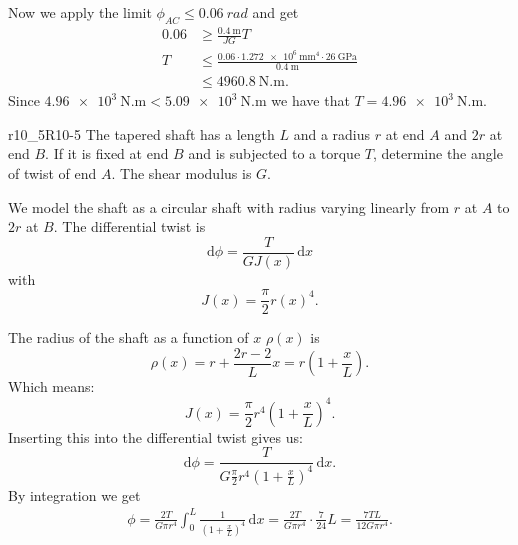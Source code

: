 \begin{derivation}
  Now we apply the limit $\phi_{AC} \leq \qty{0,06}{rad}$ and get
  \begin{align*}
    \num{0,06} &\geq \frac{\qty{0,4}{\m}}{JG} T \\
    T &\leq \frac{\num{0.06} \cdot \qty{1,272e6}{\mm^{4}} \cdot \qty{26}{\GPa}}{\qty{0,4}{\m} } \\
      &\leq \qty{4960,8}{\N.\m} 
  .\end{align*}
  Since $\qty{4,96e3}{\N.\m} < \qty{5,09e3}{\N.\m}$ we have that $T = \qty{4,96e3}{\N.\m}$.
\end{derivation}


\begin{problemwithimage}{r10_5}{R10-5}
  The tapered shaft has a length $L$ and a radius $r$ at end $A$ and $2r$ at end $B$.
  If it is fixed at end $B$ and is subjected to a torque $T$, determine the angle of twist of end $A$.
  The shear modulus is $G$.
\end{problemwithimage}

\begin{derivation}
  We model the shaft as a circular shaft with radius varying linearly from $r$ at $A$ to $2r$ at $B$.
  The differential twist is
  \begin{equation*}
    \mathrm{d}\phi = \frac{T}{GJ(x)} \, \mathrm{d}x 
  \end{equation*}
  with
  \begin{equation*}
    J(x) = \frac{\pi}{2} r(x)^{4}
  .\end{equation*}
  
  The radius of the shaft as a function of $x$ $\rho(x)$ is
  \begin{equation*}
    \rho(x) = r + \frac{2r - 2}{L}x = r \left( 1 + \frac{x}{L} \right)
  .\end{equation*}
  Which means:
  \begin{equation*}
    J(x) = \frac{\pi}{2} r^{4} \left( 1 + \frac{x}{L} \right)^{4}
  .\end{equation*}
  Inserting this into the differential twist gives us:
  \begin{equation*}
    \mathrm{d}\phi = \frac{T}{G \frac{\pi}{2} r^{4} \left( 1 + \frac{x}{L} \right)^{4}} \, \mathrm{d}x 
  .\end{equation*}
  By integration we get
  \begin{align*}
    \phi = \frac{2T}{G \pi r^{4}} \int_{0}^{L} \frac{1}{\left( 1 + \frac{x}{L} \right)^{4}}\, \mathrm{d}x  = \frac{2T}{G \pi r^{4}} \cdot \frac{7}{24} L = \frac{7 TL}{12 G \pi r^{4}}
  .\end{align*}
\end{derivation}


